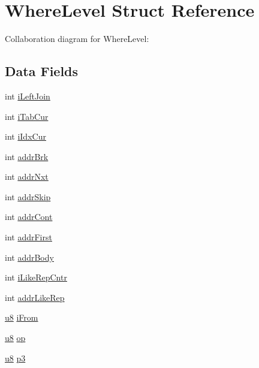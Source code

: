 \hypertarget{struct_where_level}{}\section{Where\+Level Struct Reference}
\label{struct_where_level}


Collaboration diagram for Where\+Level\+:
\subsection*{Data Fields}
\begin{DoxyCompactItemize}
\item 
int \hyperlink{struct_where_level_a79a899518a34f0fc50ab104412fe1ab1}{i\+Left\+Join}
\item 
int \hyperlink{struct_where_level_a103f2fe41869e2e93ecca3ab667b0a5a}{i\+Tab\+Cur}
\item 
int \hyperlink{struct_where_level_aecc5f6fc895b5d32e286a8a34ebbec98}{i\+Idx\+Cur}
\item 
int \hyperlink{struct_where_level_ad1b2cf3d5417f400ef25e11d7e75668c}{addr\+Brk}
\item 
int \hyperlink{struct_where_level_aa890851807d02a557a64464694c2190b}{addr\+Nxt}
\item 
int \hyperlink{struct_where_level_a9f619c343c9098910c3b4aad6b570171}{addr\+Skip}
\item 
int \hyperlink{struct_where_level_a7d833ccdc1fa083eeb29104ce6f31f41}{addr\+Cont}
\item 
int \hyperlink{struct_where_level_ab50af87e2ba502a5a49807b2eaee976e}{addr\+First}
\item 
int \hyperlink{struct_where_level_aafb1eec74f5f867b898e92324f78d46f}{addr\+Body}
\item 
int \hyperlink{struct_where_level_a1503c6ce7512eec00b17c99515601372}{i\+Like\+Rep\+Cntr}
\item 
int \hyperlink{struct_where_level_a04ef159ee611aabe3cbcfe9d5c05f306}{addr\+Like\+Rep}
\item 
\hyperlink{sqlite3_8c_a74a0f6424ae628af25f23f0a35f6ead3}{u8} \hyperlink{struct_where_level_af49ca5d468f3332716f64944ed6f07e9}{i\+From}
\item 
\hyperlink{sqlite3_8c_a74a0f6424ae628af25f23f0a35f6ead3}{u8} \hyperlink{struct_where_level_a0991b29aa40e12f033237266ebe6610c}{op}
\item 
\hyperlink{sqlite3_8c_a74a0f6424ae628af25f23f0a35f6ead3}{u8} \hyperlink{struct_where_level_a47eadd11a1fdd79088fa6e4e6be69cd4}{p3}

\end{DoxyCompactItemize}
